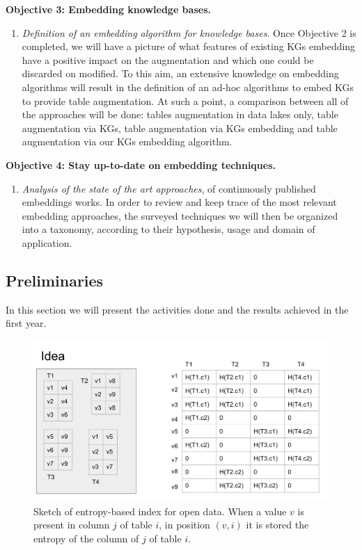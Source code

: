 \noindent\textbf{Objective 3: Embedding knowledge bases.}
\begin{enumerate}
    \item \textit{Definition of an embedding algorithm for knowledge bases}. Once Objective 2 is completed, we will have a picture of what features of existing KGs embedding have a positive impact on the augmentation and which one could be discarded on modified. To this aim, an extensive knowledge on embedding algorithms will result in the definition of an ad-hoc algorithms to embed KGs to provide table augmentation. At such a point, a comparison between all of the approaches will be done: tables augmentation in data lakes only, table augmentation via KGs, table augmentation via KGs embedding and table augmentation via our KGs embedding algorithm.  
\end{enumerate}

\noindent\textbf{Objective 4: Stay up-to-date on embedding techniques.}
\begin{enumerate}
    \item \textit{Analysis of the state of the art approaches}, of continuously published embeddings works. In order to review and keep trace of the most relevant embedding approaches, the surveyed techniques we will then be organized into a taxonomy, according to their hypothesis, usage and domain of application.
\end{enumerate}



\subsection{Preliminaries}\label{sub_preliminaries}
In this section we will present the activities done and the results achieved in the first year.

\begin{figure}[t]\label{index_sketch}
    \includegraphics[scale=0.4]{figures/index_sketch.png}
    \caption{Sketch of entropy-based index for open data. When a value $v$ is present in column $j$ of table $i$, in position $(v,i)$ it is stored the entropy of the column of $j$ of table $i$.}
\end{figure}

